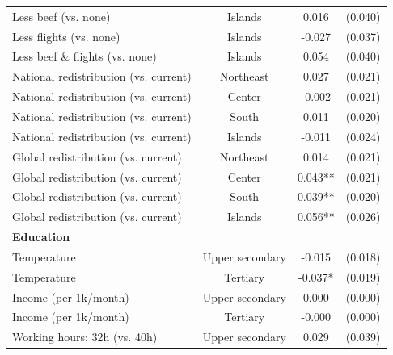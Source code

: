 \begin{table}[H]
\begin{tabular}{ l c c c }
\hspace{0.05cm} Less beef (vs. none) & Islands & 0.016 & (0.040) \\
\hspace{0.05cm} Less flights (vs. none) & Islands & -0.027 & (0.037) \\
\hspace{0.05cm} Less beef \& flights (vs. none) & Islands & 0.054 & (0.040) \\
\hspace{0.05cm} National redistribution (vs. current) & Northeast & 0.027 & (0.021) \\
\hspace{0.05cm} National redistribution (vs. current) & Center & -0.002 & (0.021) \\
\hspace{0.05cm} National redistribution (vs. current) & South & 0.011 & (0.020) \\
\hspace{0.05cm} National redistribution (vs. current) & Islands & -0.011 & (0.024) \\
\hspace{0.05cm} Global redistribution (vs. current) & Northeast & 0.014 & (0.021) \\
\hspace{0.05cm} Global redistribution (vs. current) & Center & 0.043** & (0.021) \\
\hspace{0.05cm} Global redistribution (vs. current) & South & 0.039** & (0.020) \\
\hspace{0.05cm} Global redistribution (vs. current) & Islands & 0.056** & (0.026) \\
\hline
\multicolumn{4}{l}{\textbf{Education}} \\
\hspace{0.05cm} Temperature & Upper secondary & -0.015 & (0.018) \\
\hspace{0.05cm} Temperature & Tertiary & -0.037* & (0.019) \\
\hspace{0.05cm} Income (per 1k/month) & Upper secondary & 0.000 & (0.000) \\
\hspace{0.05cm} Income (per 1k/month) & Tertiary & -0.000 & (0.000) \\
\hspace{0.05cm} Working hours: 32h (vs. 40h) & Upper secondary & 0.029 & (0.039) \\

\end{tabular}
\end{table}
